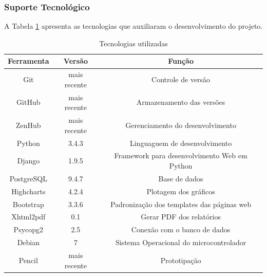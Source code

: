 \subsubsection{Suporte Tecnológico}

	A Tabela \ref{tab:tech} apresenta as tecnologias que auxiliaram o desenvolvimento do projeto.

	\begin{table}[h]
	\centering
	\caption{Tecnologias utilizadas}
	\label{tab:tech}
	\begin{tabular}{ccc}
	\hline
	\textbf{Ferramenta}              & \textbf{Versão}                   & \textbf{Função}                                                   \\ \hline
	\multicolumn{1}{|c|}{Git}        & \multicolumn{1}{c|}{mais recente} & \multicolumn{1}{c|}{Controle de versão}                           \\ \hline
	\multicolumn{1}{|c|}{GitHub}     & \multicolumn{1}{c|}{mais recente} & \multicolumn{1}{c|}{Armazenamento das versões}                    \\ \hline
	\multicolumn{1}{|c|}{ZenHub}     & \multicolumn{1}{c|}{mais recente} & \multicolumn{1}{c|}{Gerenciamento do desenvolvimento}             \\ \hline
	\multicolumn{1}{|c|}{Python}     & \multicolumn{1}{c|}{3.4.3}        & \multicolumn{1}{c|}{Linguaguem de desenvolvimento}                \\ \hline
	\multicolumn{1}{|c|}{Django}     & \multicolumn{1}{c|}{1.9.5}        & \multicolumn{1}{c|}{Framework para desenvolvimento Web em Python} \\ \hline
	\multicolumn{1}{|c|}{PostgreSQL} & \multicolumn{1}{c|}{9.4.7}        & \multicolumn{1}{c|}{Base de dados}                                \\ \hline
	\multicolumn{1}{|c|}{Highcharts} & \multicolumn{1}{c|}{4.2.4}        & \multicolumn{1}{c|}{Plotagem dos gráficos}                        \\ \hline
	\multicolumn{1}{|c|}{Bootstrap}  & \multicolumn{1}{c|}{3.3.6}        & \multicolumn{1}{c|}{Padronização dos templates das páginas web}   \\ \hline
	\multicolumn{1}{|c|}{Xhtml2pdf}  & \multicolumn{1}{c|}{0.1}          & \multicolumn{1}{c|}{Gerar PDF dos relatórios}                     \\ \hline
	\multicolumn{1}{|c|}{Psycopg2}   & \multicolumn{1}{c|}{2.5}          & \multicolumn{1}{c|}{Conexão com o banco de dados}                 \\ \hline
	\multicolumn{1}{|c|}{Debian}     & \multicolumn{1}{c|}{7}            & \multicolumn{1}{c|}{Sistema Operacional do microcontrolador}      \\ \hline
	\multicolumn{1}{|c|}{Pencil}     & \multicolumn{1}{c|}{mais recente} & \multicolumn{1}{c|}{Prototipação}                                 \\ \hline
	\end{tabular}
	\end{table}




